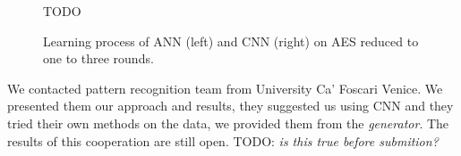 \documentclass[
  print, %
  Table,   %
  nolof,     %
  nolot,     %
  11pt, %
  oneside  %
]{fithesis3}
\newcommand{\todo}[1]{TODO: \textit{#1}}
\begin{document}
\begin{figure}[H]

\centering{}

TODO

\caption{Learning process of ANN (left) and CNN (right) on AES reduced to one to three rounds.}
\label{fig:ann-learning}
\end{figure}

We contacted pattern recognition team from University Ca’ Foscari Venice. We presented them our approach and results, they suggested us using CNN and they tried their own methods on the data, we provided them from the \textit{generator}. The results of this cooperation are still open. \todo{is this true before submition?}







\end{document}
